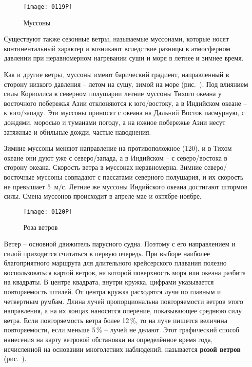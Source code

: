 \begin{figure}[htb]
  \centering{}
  \texttt{[image: 0119P]}
  \caption{Муссоны}
  \label{fig:119}
\end{figure}

Существуют также сезонные ветры, называемые муссонами, которые носят
континентальный характер и возникают вследствие разницы в атмосферном
давлении при неравномерном нагревании суши и моря в летнее и зимнее
время.

Как и другие ветры, муссоны имеют барический градиент, направленный в
сторону низкого давления \--- летом на сушу, зимой на море
(рис.~). Под влиянием силы Кориолиса в северном полушарии
летние муссоны Тихого океана у восточного побережья Азии отклоняются к
юго\-/востоку, а в Индийском океане \--- к юго\-/западу. Эти муссоны
приносят с океана на Дальний Восток пасмурную, с дождями, моросью и
туманами погоду, а на южное побережье Азии несут затяжные и обильные
дожди, частые наводнения.

Зимние муссоны меняют направление на противоположное (120\gr{}\gr), и в Тихом океане они дуют уже с северо\-/запада, а в
Индийском \--- с северо\-/востока в сторону океана. Скорость ветра в
муссонах неравномерна. Зимние северо\-/восточные муссоны совпадают с
пассатами северного полушария, и их скорость не превышает 5~м/с. Летние же муссоны Индийского океана достигают штормов
силы. Смена муссонов происходит в апреле\--мае и октябре\--ноябре.

\begin{figure}[htb]
  \centering{}
  \texttt{[image: 0120P]}
  \caption{Роза ветров}
  \label{fig:120}
\end{figure}

Ветер \--- основной движитель парусного судна. Поэтому с его
направлением и силой приходится считаться в первую очередь. При выборе
наиболее благоприятного маршрута для длительного крейсерского плавания
полезно воспользоваться картой ветров, на которой поверхность моря или
океана разбита на квадраты. В центре квадрата, внутри кружка, цифрами
указывается повторяемость штилей. От центра кружка расходятся лучи по
главным и четвертным румбам. Длина лучей пропорциональна повторяемости
ветров этого направления, а на их концах наносится оперение,
показывающее среднюю силу ветра. Если повторяемость ветра более
12\,\%, то на луче пишется величина повторяемости, если меньше 5\,\%
\--- лучей не делают. Этот графический способ нанесения на карту
ветровой обстановки на определённое время года, исчисленной на
основании многолетних наблюдений, называется
\textbf{розой ветров} (рис.~).

